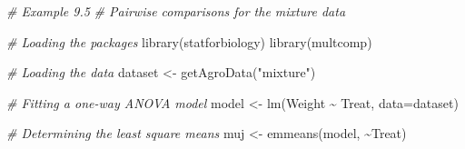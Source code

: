 \documentclass[
  12pt,
]{book}
\newenvironment{Shaded}{\begin{snugshade}}{\end{snugshade}}
\newcommand{\AttributeTok}[1]{\textcolor[rgb]{0.77,0.63,0.00}{#1}}
\newcommand{\CommentTok}[1]{\textcolor[rgb]{0.56,0.35,0.01}{\textit{#1}}}
\newcommand{\FunctionTok}[1]{\textcolor[rgb]{0.00,0.00,0.00}{#1}}
\newcommand{\NormalTok}[1]{#1}
\newcommand{\OtherTok}[1]{\textcolor[rgb]{0.56,0.35,0.01}{#1}}
\newcommand{\SpecialCharTok}[1]{\textcolor[rgb]{0.00,0.00,0.00}{#1}}
\newcommand{\StringTok}[1]{\textcolor[rgb]{0.31,0.60,0.02}{#1}}
\begin{document}
\small

\begin{Shaded}
\begin{Highlighting}[]
\CommentTok{\# Example 9.5}
\CommentTok{\# Pairwise comparisons for the \textquotesingle{}mixture\textquotesingle{} data}

\CommentTok{\# Loading the packages}
\FunctionTok{library}\NormalTok{(statforbiology)}
\FunctionTok{library}\NormalTok{(multcomp)}

\CommentTok{\# Loading the data}
\NormalTok{dataset }\OtherTok{\textless{}{-}} \FunctionTok{getAgroData}\NormalTok{(}\StringTok{"mixture"}\NormalTok{)}

\CommentTok{\# Fitting a one{-}way ANOVA model}
\NormalTok{model }\OtherTok{\textless{}{-}} \FunctionTok{lm}\NormalTok{(Weight }\SpecialCharTok{\textasciitilde{}}\NormalTok{ Treat, }\AttributeTok{data=}\NormalTok{dataset)}

\CommentTok{\# Determining the least square means}
\NormalTok{muj }\OtherTok{\textless{}{-}} \FunctionTok{emmeans}\NormalTok{(model, }\SpecialCharTok{\textasciitilde{}}\NormalTok{Treat)}


\end{Highlighting}
\end{Shaded}
\end{document}
